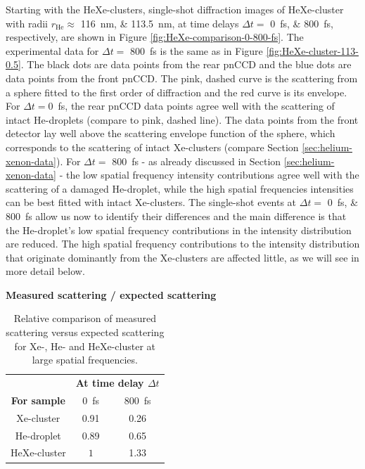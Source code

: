 %
Starting with the HeXe-clusters, single-shot diffraction images of HeXe-cluster with radii $r_{\text{He}}\approx$ \SIlist{116;113.5}{\nano\meter}, at time delays $\Delta t =$ \SIlist{0;800}{\femto\second}, respectively, are shown in Figure \ref{fig:HeXe-comparison-0-800-fs}. The experimental data for $\Delta t =$ \SI{800}{\femto\second} is the same as in Figure \ref{fig:HeXe-cluster-113-0.5}. The black dots are data points from the rear pnCCD and the blue dots are data points from the front pnCCD. The pink, dashed curve is the scattering from a sphere fitted to the first order of diffraction and the red curve is its envelope. 
For $\Delta t=$\SI{0}{\femto\second}, the rear pnCCD data points agree well with the scattering of intact He-droplets (compare to pink, dashed line). The data points from the front detector lay well above the scattering envelope function of the sphere, which corresponds to the scattering of intact Xe-clusters (compare Section \ref{sec:helium-xenon-data}). For $\Delta t =$ \SI{800}{\femto\second} - as already discussed in Section \ref{sec:helium-xenon-data} - the low spatial frequency intensity contributions agree well with the scattering of a damaged He-droplet, while the high spatial frequencies intensities can be best fitted with intact Xe-clusters. The single-shot events at $\Delta t=$ \SIlist{0;800}{\femto\second} allow us now to identify their differences and the main difference is that the He-droplet's low spatial frequency contributions in the intensity distribution are reduced. The high spatial frequency contributions to the intensity distribution that originate dominantly from the Xe-clusters are affected little, as we will see in more detail below.\\[1\baselineskip]
%
\begin{table}%
\centering
\textbf{Measured scattering / expected scattering}\\
\begin{tabular}{ | c || c | c | }
\hline
	 &\multicolumn{2}{c|}{\textbf{At time delay $\Delta t$}} \\
	\textbf{For sample} & \SI{0}{\femto\second}  & \SI{800}{\femto\second} \\ \hline \hline
	Xe-cluster & \num{0.91} & \num{0.26} \\ \hline
	He-droplet & \num{0.89} & \num{0.65} \\ \hline
	HeXe-cluster & $1$ & \num{1.33} \\ \hline
\end{tabular}
\caption[Relative comparison of measured scattering versus expected scattering.]{Relative comparison of measured scattering versus expected scattering for Xe-, He- and HeXe-cluster at large spatial frequencies.}
\label{tab:he-vs-xe-vs-hexe-summary}
\end{table}
